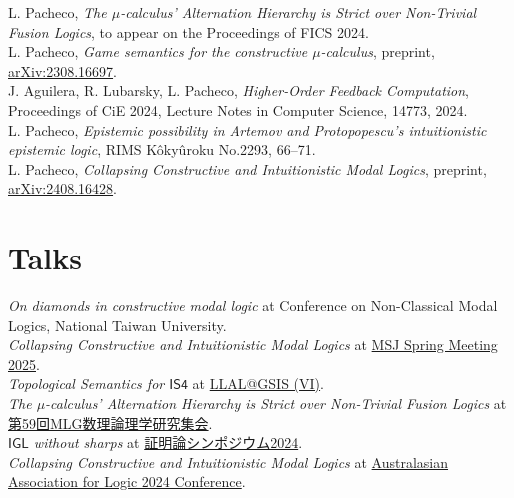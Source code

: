 \documentclass[11pt, a4paper]{article}
\newcommand{\years}[1]{\marginnote{\scriptsize #1}}
\begin{document}
L. Pacheco, \emph{The $\mu$-calculus' Alternation Hierarchy is Strict over Non-Trivial Fusion Logics}, to appear on the Proceedings of FICS 2024. \\

L. Pacheco, \emph{Game semantics for the constructive $\mu$-calculus}, preprint, \href{https://arxiv.org/abs/2308.16697}{arXiv:2308.16697}. \\

J. Aguilera, R. Lubarsky, L. Pacheco, \emph{Higher-Order Feedback Computation}, Proceedings of CiE 2024, Lecture Notes in Computer Science, 14773, 2024. \\

L. Pacheco, \emph{Epistemic possibility in Artemov and Protopopescu’s intuitionistic epistemic logic}, RIMS Kôkyûroku No.2293, 66--71. \\

L. Pacheco, \emph{Collapsing Constructive and Intuitionistic Modal Logics}, preprint, \href{https://arxiv.org/abs/2408.16428}{arXiv:2408.16428}.

\newpage
\section*{Talks}

\years{2025} \emph{On diamonds in constructive modal logic} at Conference on Non-Classical Modal Logics, National Taiwan University.\\

\years{2025} \emph{Collapsing Constructive and Intuitionistic Modal Logics} at \href{https://www.mathsoc.jp/en/meeting/waseda25mar/}{MSJ Spring Meeting 2025}.\\

\years{2025} \emph{Topological Semantics for \(\mathsf{IS4}\)} at \href{https://sites.google.com/view/llal-at-gsis/meetings/llalgsis-6}{LLAL@GSIS (VI)}.\\

\years{2025} \emph{The \(\mu\)-calculus' Alternation Hierarchy is Strict over Non-Trivial Fusion Logics} at \href{https://sites.google.com/view/mlg59}{第59回MLG数理論理学研究集会}.\\

\years{2024} \emph{\(\mathsf{IGL}\) without sharps} at \href{https://sites.google.com/view/proof-theory-2024/home}{証明論シンポジウム2024}.\\

\years{2024} \emph{Collapsing Constructive and Intuitionistic Modal Logics} at \href{https://sites.google.com/view/aalogic/past-aal-conferences/aal-conference-2024?authuser=0}{Australasian Association for Logic 2024 Conference}.\\
\end{document}
